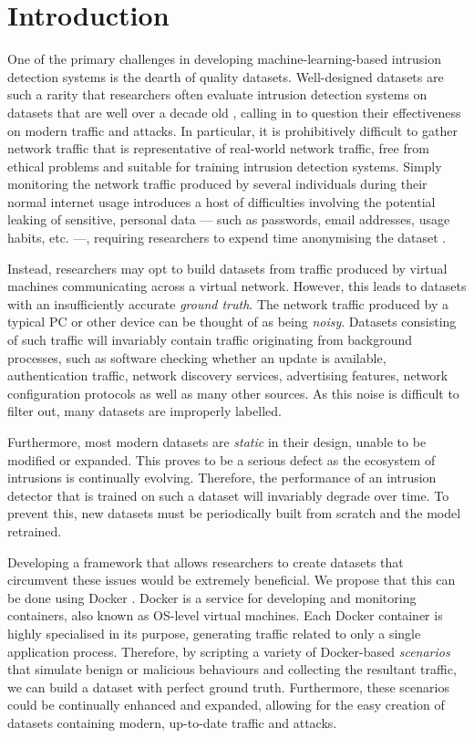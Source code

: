 \documentclass[msc,deptreport, cs]{infthesis} %
\begin{document}
\chapter{Introduction}


One of the primary challenges in developing machine-learning-based intrusion detection systems is the dearth of quality datasets. Well-designed datasets are such a rarity that researchers often evaluate intrusion detection systems on datasets that are well over a decade old \cite{tavallaee2009detailed} \cite{kayacik2005selecting}, calling in to question their effectiveness on modern traffic and attacks. In particular, it is prohibitively difficult to gather network traffic that is representative of real-world network traffic, free from ethical problems and suitable for training intrusion detection systems. Simply monitoring the network traffic produced by several individuals during their normal internet usage introduces a host of difficulties involving the potential leaking of sensitive, personal data --- such as passwords, email addresses, usage habits, etc. ---, requiring researchers to expend time anonymising the dataset \cite{mirsky2016sherlock}. 


Instead, researchers may opt to build datasets from traffic produced by virtual machines communicating across a virtual network. However, this leads to datasets with an insufficiently accurate \textit{ground truth}. The network traffic produced by a typical PC or other device can be thought of as being \textit{noisy}. Datasets consisting of such traffic will invariably contain traffic originating from background processes, such as software checking whether an update is available, authentication traffic, network discovery services, advertising features, network configuration protocols as well as many other sources. As this noise is difficult to filter out, many datasets are improperly labelled.

Furthermore, most modern datasets are \textit{static} in their design, unable to be modified or expanded. This proves to be a serious defect as the ecosystem of intrusions is continually evolving. Therefore, the performance of an intrusion detector that is trained on such a dataset will invariably degrade over time. To prevent this, new datasets must be periodically built from scratch and the model retrained.

Developing a framework that allows researchers to create datasets that circumvent these issues would be extremely beneficial. We propose that this can be done using Docker \cite{docker}. Docker is a service for developing and monitoring containers, also known as OS-level virtual machines. Each Docker container is highly specialised in its purpose, generating traffic related to only a single application process. Therefore, by scripting a variety of Docker-based \textit{scenarios} that simulate benign or malicious behaviours and collecting the resultant traffic, we can build a dataset with perfect ground truth. Furthermore, these scenarios could be continually enhanced and expanded, allowing for the easy creation of datasets containing modern, up-to-date traffic and attacks. 
\end{document}
